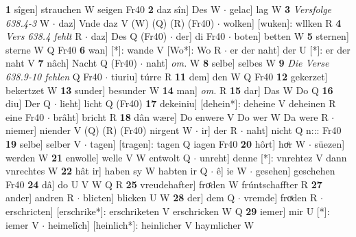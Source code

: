 \documentclass[8pt,a4paper,notitlepage]{article}
\begin{document}
\begin{table}[ht]
\begin{minipage}[t]{0.5\linewidth}
\textbf{1} sîgen] strauchen W seigen Fr40 \textbf{2} daz sîn] Des W  $\cdot$ gelac] lag W \textbf{3} \textit{Versfolge 638.4-3} W   $\cdot$ daz] Vnde daz V (W) (Q) (R) (Fr40)  $\cdot$ wolken] [wuken]: wllken R \textbf{4} \textit{Vers 638.4 fehlt} R   $\cdot$ daz] Des Q (Fr40)  $\cdot$ der] di Fr40  $\cdot$ boten] betten W \textbf{5} sternen] sterne W Q Fr40 \textbf{6} wan] [*]: wande V [Wo*]: Wo R  $\cdot$ er der naht] der U [*]: er der naht V \textbf{7} nâch] Nacht Q (Fr40)  $\cdot$ naht] \textit{om.} W \textbf{8} selbe] selbes W \textbf{9} \textit{Die Verse 638.9-10 fehlen} Q Fr40   $\cdot$ tiuriu] túrre R \textbf{11} dem] den W Q Fr40 \textbf{12} gekerzet] bekertzet W \textbf{13} sunder] besunder W \textbf{14} man] \textit{om.} R \textbf{15} dar] Das W Do Q \textbf{16} diu] Der Q  $\cdot$ lieht] licht Q (Fr40) \textbf{17} dekeiniu] [dehein*]: deheine V deheinen R eine Fr40  $\cdot$ brâht] bricht R \textbf{18} dân wære] Do enwere V Do wer W Da were R  $\cdot$ niemer] niender V (Q) (R) (Fr40) nirgent W  $\cdot$ ir] der R  $\cdot$ naht] nicht Q n::: Fr40 \textbf{19} selbe] selber V  $\cdot$ tagen] [tragen]: tagen Q iagen Fr40 \textbf{20} hôrt] hoͤr W  $\cdot$ süezen] werden W \textbf{21} enwolle] welle V W entwolt Q  $\cdot$ unreht] denne [*]: vnrehtez V dann vnrechtes W \textbf{22} hât ir] haben sy W habten ir Q  $\cdot$ ê] ie W  $\cdot$ gesehen] geschehen Fr40 \textbf{24} dâ] do U V W Q R \textbf{25} vreudehafter] froͤden W frúntschaffter R \textbf{27} ander] andren R  $\cdot$ blicten] blicken U W \textbf{28} der] dem Q  $\cdot$ vremde] froͯden R  $\cdot$ erschricten] [erschrike*]: erschriketen V erschricken W Q \textbf{29} iemer] mir U [*]: iemer V  $\cdot$ heimelîch] [heinlich*]: heinlicher V haymlicher W \newline
\end{minipage}
\end{table}
\end{document}
